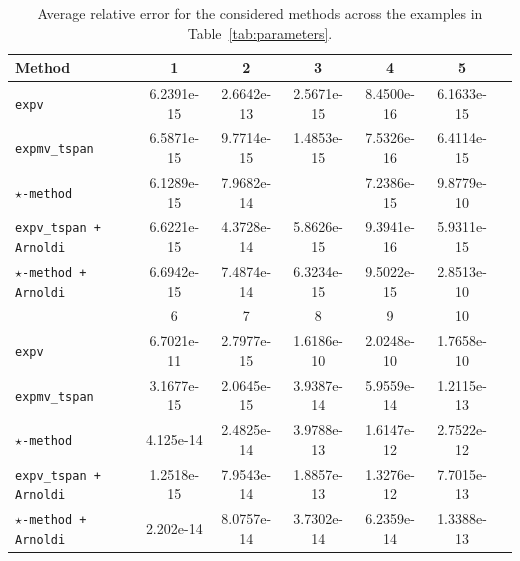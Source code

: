\documentclass[final,1p,times,number]{elsarticle}
\theoremstyle{plain}%
\begin{document}
\begin{table}[t]
\centering
\caption{Average relative error for the considered methods across the examples in Table~\ref{tab:parameters}.}
\label{tab:relative_error}
\begin{tabular}{lcccccc}
\toprule
\textbf{Method} & 1 & 2 & 3 & 4 & 5  \\ 
\midrule
\texttt{expv}                     & 6.2391e-15 & 2.6642e-13 & 2.5671e-15 & 8.4500e-16 & 6.1633e-15 \\ 
\texttt{expmv\_tspan}             & 6.5871e-15 & 9.7714e-15 & 1.4853e-15 & 7.5326e-16 & 6.4114e-15 \\ 
\texttt{$\star$-method}           & 6.1289e-15 & 7.9682e-14 &            & 7.2386e-15 & 9.8779e-10 \\ 
\texttt{expv\_tspan + Arnoldi}    & 6.6221e-15 & 4.3728e-14 & 5.8626e-15 & 9.3941e-16 & 5.9311e-15 \\ 
\texttt{$\star$-method + Arnoldi} & 6.6942e-15 & 7.4874e-14 & 6.3234e-15 & 9.5022e-15 & 2.8513e-10 \\ 
\midrule
 & 6 & 7 & 8 & 9 & 10  \\ 
\midrule
\texttt{expv}                     & 6.7021e-11 & 2.7977e-15 & 1.6186e-10 & 2.0248e-10 &  1.7658e-10 \\ 
\texttt{expmv\_tspan}             & 3.1677e-15 & 2.0645e-15 & 3.9387e-14 & 5.9559e-14 &  1.2115e-13 \\ 
\texttt{$\star$-method}           & 4.125e-14 & 2.4825e-14 &  3.9788e-13 & 1.6147e-12 & 2.7522e-12  \\ 
\texttt{expv\_tspan + Arnoldi}    & 1.2518e-15 & 7.9543e-14 & 1.8857e-13 & 1.3276e-12 & 7.7015e-13 \\ 
\texttt{$\star$-method + Arnoldi} & 2.202e-14 & 8.0757e-14 & 3.7302e-14 & 6.2359e-14 & 1.3388e-13 \\ 
        \bottomrule
\end{tabular}
\end{table}
\end{document}
